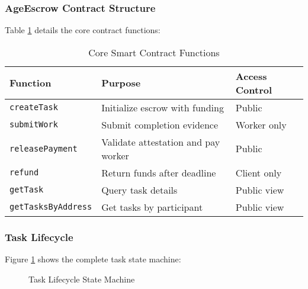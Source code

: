 \documentclass[12pt,a4paper]{article}
\begin{document}
\subsubsection{AgeEscrow Contract Structure}

Table \ref{tab:contract-functions} details the core contract functions:

\begin{table}[h]
\centering
\begin{tabular}{|l|p{6cm}|p{4cm}|}
\hline
\textbf{Function} & \textbf{Purpose} & \textbf{Access Control} \\
\hline
\texttt{createTask} & Initialize escrow with funding & Public \\
\hline
\texttt{submitWork} & Submit completion evidence & Worker only \\
\hline
\texttt{releasePayment} & Validate attestation and pay worker & Public \\
\hline
\texttt{refund} & Return funds after deadline & Client only \\
\hline
\texttt{getTask} & Query task details & Public view \\
\hline
\texttt{getTasksByAddress} & Get tasks by participant & Public view \\
\hline
\end{tabular}
\caption{Core Smart Contract Functions}
\label{tab:contract-functions}
\end{table}

\subsubsection{Task Lifecycle}

Figure \ref{fig:task-lifecycle} shows the complete task state machine:

\begin{figure}[h]
\centering
{}
\caption{Task Lifecycle State Machine}
\label{fig:task-lifecycle}
\end{figure}
\end{document}
